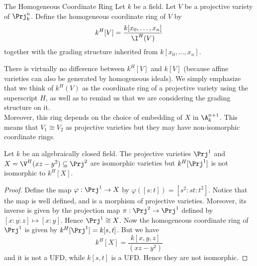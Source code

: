 \documentclass[a4paper]{article}
\begin{document}
\begin{defn}{The Homogeneous Coordinate Ring}{} Let $k$ be a field. Let $V$ be a projective variety of $\Prj_k^n$. Define the homogeneous coordinate ring of $V$ by $$k^H[V]=\frac{k[x_0,\dots,x_n]}{\I^H(V)}$$ together with the grading structure inherited from $k[x_0,\dots,x_n]$. 
\end{defn}

There is virtually no difference between $k^H[V]$ and $k[V]$ (because affine varieties can also be generated by homogeneous ideals). We simply emphasize that we think of $k^H(V)$ as the coordinate ring of a projective variety using the superscript $H$, as well as to remind us that we are considering the grading structure on it. \\

Moreover, this ring depends on the choice of embedding of $X$ in $\A_k^{n+1}$. This means that $V_1\cong V_2$ as projective varieties but they may have non-isomorphic coordinate rings. 

\begin{eg}{}{} Let $k$ be an algebraically closed field. The projective varieties $\Prj^1$ and $X=\V^H(xz-y^2)\subseteq\Prj^2$ are isomorphic varieties but $k^H[\Prj^1]$ is not isomorphic to $k^H[X]$. 
\begin{proof}
Define the map $\varphi:\Prj^1\to X$ by $\varphi([s:t])=[s^2:st:t^2]$. Notice that the map is well defined, and is a morphism of projective varieties. Moreover, its inverse is given by the projection map $\pi:\Prj^2\to\Prj^1$ defined by $[x:y:z]\mapsto[x:y]$. Hence $\Prj^1\cong X$. Now the homogeneous coordinate ring of $\Prj^1$ is given by $k^H[\Prj^1]=k[s,t]$. But we have $$k^H[X]=\frac{k[x,y,z]}{(xz-y^2)}$$ and it is not a UFD, while $k[s,t]$ is a UFD. Hence they are not isomorphic. 
\end{proof}
\end{eg}
\end{document}
